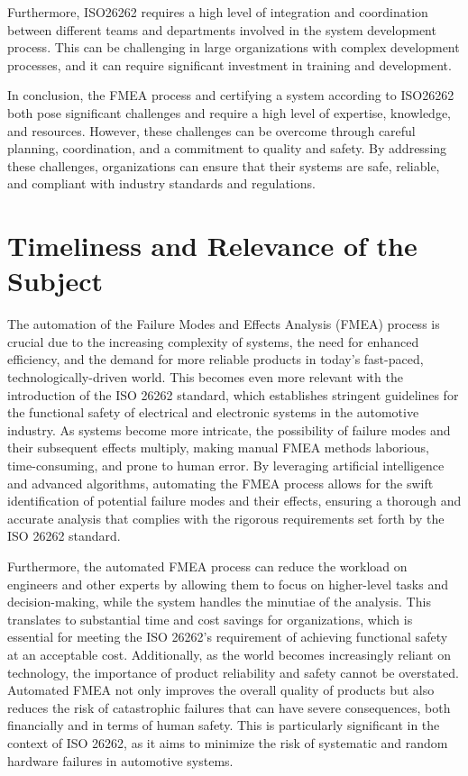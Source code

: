 \documentclass[./dissertation.tex]{subfiles}
\begin{document}
Furthermore, ISO26262 requires a high level of integration and coordination between different teams and departments involved in the system development process. This can be challenging in large organizations with complex development processes, and it can require significant investment in training and development.

In conclusion, the FMEA process and certifying a system according to ISO26262 both pose significant challenges and require a high level of expertise, knowledge, and resources. However, these challenges can be overcome through careful planning, coordination, and a commitment to quality and safety. By addressing these challenges, organizations can ensure that their systems are safe, reliable, and compliant with industry standards and regulations.

\section{Timeliness and Relevance of the Subject}
The automation of the Failure Modes and Effects Analysis (FMEA) process is crucial due to the increasing complexity of systems, the need for enhanced efficiency, and the demand for more reliable products in today's fast-paced, technologically-driven world. This becomes even more relevant with the introduction of the ISO 26262 standard, which establishes stringent guidelines for the functional safety of electrical and electronic systems in the automotive industry. As systems become more intricate, the possibility of failure modes and their subsequent effects multiply, making manual FMEA methods laborious, time-consuming, and prone to human error. By leveraging artificial intelligence and advanced algorithms, automating the FMEA process allows for the swift identification of potential failure modes and their effects, ensuring a thorough and accurate analysis that complies with the rigorous requirements set forth by the ISO 26262 standard.

Furthermore, the automated FMEA process can reduce the workload on engineers and other experts by allowing them to focus on higher-level tasks and decision-making, while the system handles the minutiae of the analysis. This translates to substantial time and cost savings for organizations, which is essential for meeting the ISO 26262's requirement of achieving functional safety at an acceptable cost. Additionally, as the world becomes increasingly reliant on technology, the importance of product reliability and safety cannot be overstated. Automated FMEA not only improves the overall quality of products but also reduces the risk of catastrophic failures that can have severe consequences, both financially and in terms of human safety. This is particularly significant in the context of ISO 26262, as it aims to minimize the risk of systematic and random hardware failures in automotive systems.
\end{document}
